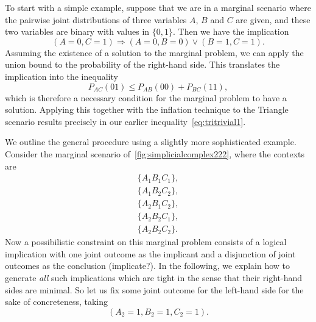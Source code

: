 To start with a simple example, suppose that we are in a marginal scenario where the pairwise joint distributions of three variables $A$, $B$ and $C$ are given, and these two variables are binary with values in $\{0,1\}$. Then we have the implication
\[
	(A=0,C=1) \Longrightarrow (A=0,B=0) \lor (B=1,C=1).
\]
Assuming the existence of a solution to the marginal problem, we can apply the union bound to the probability of the right-hand side. This translates the implication into the inequality
\[
	P_{AC}(01) \leq P_{AB}(00) + P_{BC}(11),
\]
which is therefore a necessary condition for the marginal problem to have a solution. Applying this together with the inflation technique to the Triangle scenario results precisely in our earlier inequality~\cref{eq:tritrivial1}.

We outline the general procedure using a slightly more sophisticated example. Consider the marginal scenario of~\cref{fig:simplicialcomplex222}, where the contexts are
\begin{align*}
	\{A_1 B_1 C_1\},\\
	\{A_1 B_2 C_2\},\\
	\{A_2 B_1 C_2\},\\
	\{A_2 B_2 C_1\},\\
	\{A_2 B_2 C_2\}.
\end{align*}
Now a possibilistic constraint on this marginal problem consists of a logical implication with one joint outcome as the implicant and a disjunction of joint outcomes as the conclusion (implicate?). In the following, we explain how to generate \emph{all} such implications which are tight in the sense that their right-hand sides are minimal. So let us fix some joint outcome for the left-hand side for the sake of concreteness, taking
\begin{equation}
	\label{eq:lhshardy}
	(A_2 = 1, B_2 = 1, C_2 = 1).
\end{equation}
